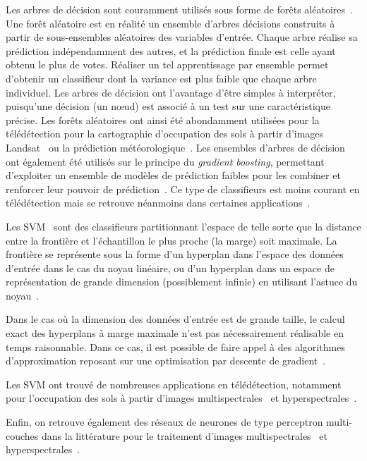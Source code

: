 Les arbres de décision sont couramment utilisés sous forme de forêts aléatoires~\cite{breiman_random_2001}. Une forêt aléatoire est en réalité un ensemble d'arbres décisions construits à partir de sous-ensembles aléatoires des variables d'entrée. Chaque arbre réalise sa prédiction indépendamment des autres, et la prédiction finale est celle ayant obtenu le plus de votes. Réaliser un tel apprentissage par ensemble permet d'obtenir un classifieur dont la variance est plus faible que chaque arbre individuel. Les arbres de décision ont l'avantage d'être simples à interpréter, puisqu'une décision (un n\oe{}ud) est associé à un test sur une caractéristique précise. Les forêts aléatoires ont ainsi été abondamment utilisées pour la télédétection pour la cartographie d'occupation des sols à partir d'images \gls{Landsat}~\cite{pal_random_2005} ou la prédiction météorologique~\cite{lary_machine_2016}. Les ensembles d'arbres de décision ont également été utilisés sur le principe du \emph{gradient boosting}, permettant d'exploiter un ensemble de modèles de prédiction faibles pour les combiner et renforcer leur pouvoir de prédiction~\cite{friedman_greedy_2001}. Ce type de classifieurs est moins courant en télédétection mais se retrouve néanmoins dans certaines applications~\cite{lawrence_classification_2004}.

Les \gls{SVM}~\cite{boser_training_1992,cortes_support-vector_1995} sont des classifieurs partitionnant l'espace de telle sorte que la distance entre la frontière et l'échantillon le plus proche (la marge) soit maximale. La frontière se représente sous la forme d'un hyperplan dans l'espace des données d'entrée dans le cas du noyau linéaire, ou d'un hyperplan dans un espace de représentation de grande dimension (possiblement infinie) en utilisant l'astuce du noyau~\cite{boser_training_1992}.

Dans le cas où la dimension des données d'entrée est de grande taille, le calcul exact des hyperplans à marge maximale n'est pas nécessairement réalisable en temps raisonnable. Dans ce cas, il est possible de faire appel à des algorithmes d'approximation reposant sur une optimisation par descente de gradient~\cite{bottou_large-scale_2010}.

Les \gls{SVM} ont trouvé de nombreuses applications en télédétection, notamment pour l'occupation des sols à partir d'images multispectrales~\cite{pal_support_2005} et hyperspectrales~\cite{melgani_classification_2004}.

Enfin, on retrouve également des réseaux de neurones de type perceptron multi-couches dans la littérature pour le traitement d'images multispectrales~\cite{benediktsson_neural_1990} et hyperspectrales~\cite{goel_classification_2003}.

